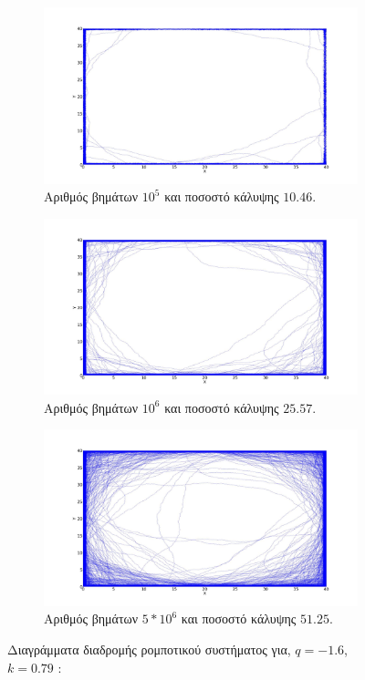 \begin{figure}[ht]
	\centering
	\begin{subfigure}[b]{0.75\textwidth}
		\centering
		\includegraphics[width=\textwidth]{LateX images/log/steps/g3-1.6}
		\caption{Αριθμός βημάτων $10^5$ και ποσοστό κάλυψης $10.46$.}
		\label{f:g109}
	\end{subfigure}
	\hfill
	\begin{subfigure}[b]{0.75\textwidth}
		\centering
		\includegraphics[width=\textwidth]{LateX images/log/steps/g2-1.6}
		\caption{Αριθμός βημάτων $10^6$ και ποσοστό κάλυψης $25.57$.}
		\label{f:g110}
	\end{subfigure}
	\hfill
	\begin{subfigure}[b]{0.75\textwidth}
		\centering
		\includegraphics[width=\textwidth]{LateX images/log/steps/g1-1.6}
		\caption{Αριθμός βημάτων $5*10^6$ και ποσοστό κάλυψης $51.25$.}
		\label{f:g111}
	\end{subfigure}
	\hfill
	\caption{Διαγράμματα διαδρομής ρομποτικού συστήματος για, $q = -1.6$, $k = 0.79$ :}
\end{figure}

